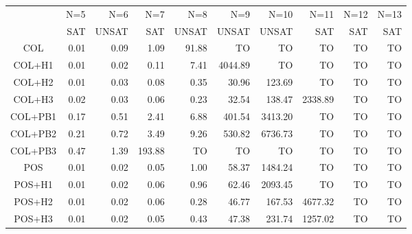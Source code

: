 
\begin{tabular}[c]{|c|r|r|r|r|r|r|r|r|r|}\hline
               & N=5  & N=6     & N=7          & N=8          &    N=9                &   N=10                   &    N=11& N=12& N=13 \\
               & SAT  & UNSAT   & SAT          & UNSAT        &  UNSAT        &  UNSAT         &    SAT & SAT & SAT \\\hline
    COL        & 0.01 & 0.09    & 1.09         & 91.88        & TO            &      TO        &      TO&   TO& TO \\
    COL+H1     & 0.01 & 0.02    & 0.11         & 7.41         & 4044.89       &      TO        &      TO&   TO& TO \\
    COL+H2     & 0.01 & 0.03    & 0.08         & 0.35         & \alert{30.96} &  \alert{123.69}&      TO&   TO& TO \\
    COL+H3     & 0.02 & 0.03    & 0.06         & \alert{0.23} & 32.54         &  138.47        & 2338.89&   TO& TO \\
    COL+PB1    & 0.17 & 0.51    & 2.41         & 6.88         & 401.54        & 3413.20        &      TO&   TO& TO \\
    COL+PB2    & 0.21 & 0.72    & 3.49         & 9.26         & 530.82        & 6736.73        &      TO&   TO& TO \\
    COL+PB3    & 0.47 & 1.39    & 193.88       & TO           & TO            & TO             &      TO&   TO& TO \\
    POS        & 0.01 & 0.02    & \alert{0.05} & 1.00         & 58.37 & 1484.24&              TO&   TO& TO \\
    POS+H1     & 0.01 & 0.02    & 0.06                  & 0.96         & 62.46 & 2093.45&              TO&   TO& TO \\
    POS+H2     & 0.01 & 0.02    & 0.06         & 0.28         & 46.77 &  167.53&         4677.32&   TO& TO \\
    POS+H3     & 0.01 & 0.02    & \alert{0.05} & 0.43         & 47.38 &  231.74& \alert{1257.02}&   TO& TO \\\hline 
\end{tabular}
